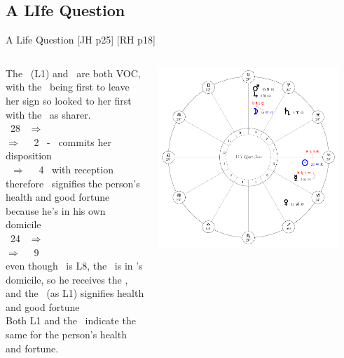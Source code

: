 \subsection{A LIfe Question}
\begin{frame}[t]{A Life Question [JH p25] [RH p18] }
\begin{columns}[T, onlytextwidth]
The \Sun\ (L1) and \Moon\ are both VOC, with the \Moon\ being first to leave her sign so looked to her first with the \Sun\ as sharer.\\
\vspace{0.25cm}
\Moon\ 28 \Aries\ $\Rightarrow$ \Taurus \\
\hspace{1em}$\Rightarrow$ \Square\ \Mercury\ 2 \Taurus\ - \Moon\ commits her disposition \\
\hspace{1em}\Mercury\ $\Rightarrow$ \Sextile\ \Saturn\ 4 \Aquarius\ with reception \\
therefore \Saturn\ signifies the person's health and good fortune because he's in his own domicile \\
\vspace{0.25cm}
\Sun\ 24 \Aquarius\ $\Rightarrow$ \Pisces \\
\hspace{1em}$\Rightarrow$ \Sextile\ \Jupiter\ 9 \Pisces \\
even though \Jupiter\ is L8, the \Sextile\ is in \Jupiter's domicile, so he receives the \Sun, and the \Sun\ (as L1) signifies health and good fortune \\
\vspace{0.25cm}
Both L1 and the \Moon\ indicate the same for the person's health and fortune.
\begin{center}
{\includegraphics[width=0.9\textwidth]{charts/22-chart-life}}
\end{center}
\end{columns}
\end{frame}
